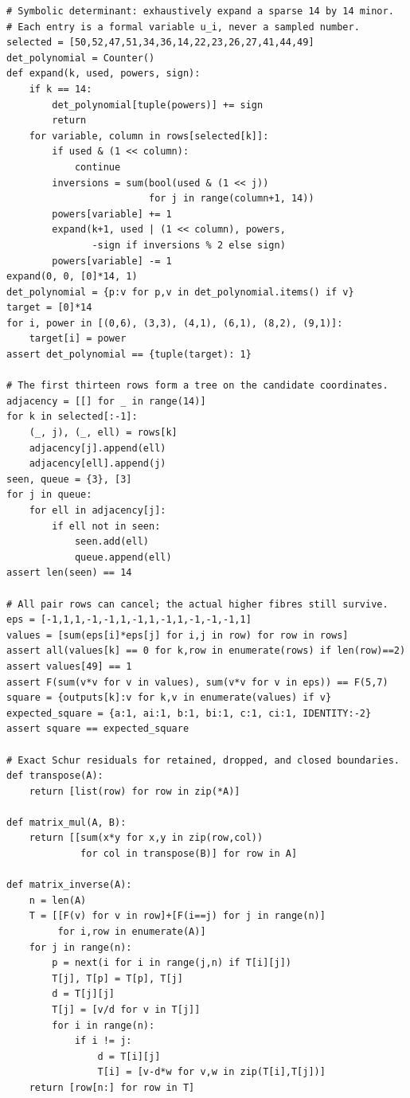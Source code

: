 \documentclass[11pt,a4paper,oneside]{report}
\theoremstyle{definition}
\theoremstyle{remark}
\begin{document}
\begin{lstlisting}
# Symbolic determinant: exhaustively expand a sparse 14 by 14 minor.
# Each entry is a formal variable u_i, never a sampled number.
selected = [50,52,47,51,34,36,14,22,23,26,27,41,44,49]
det_polynomial = Counter()
def expand(k, used, powers, sign):
    if k == 14:
        det_polynomial[tuple(powers)] += sign
        return
    for variable, column in rows[selected[k]]:
        if used & (1 << column):
            continue
        inversions = sum(bool(used & (1 << j))
                         for j in range(column+1, 14))
        powers[variable] += 1
        expand(k+1, used | (1 << column), powers,
               -sign if inversions % 2 else sign)
        powers[variable] -= 1
expand(0, 0, [0]*14, 1)
det_polynomial = {p:v for p,v in det_polynomial.items() if v}
target = [0]*14
for i, power in [(0,6), (3,3), (4,1), (6,1), (8,2), (9,1)]:
    target[i] = power
assert det_polynomial == {tuple(target): 1}

# The first thirteen rows form a tree on the candidate coordinates.
adjacency = [[] for _ in range(14)]
for k in selected[:-1]:
    (_, j), (_, ell) = rows[k]
    adjacency[j].append(ell)
    adjacency[ell].append(j)
seen, queue = {3}, [3]
for j in queue:
    for ell in adjacency[j]:
        if ell not in seen:
            seen.add(ell)
            queue.append(ell)
assert len(seen) == 14

# All pair rows can cancel; the actual higher fibres still survive.
eps = [-1,1,1,-1,-1,1,-1,1,-1,1,-1,-1,-1,1]
values = [sum(eps[i]*eps[j] for i,j in row) for row in rows]
assert all(values[k] == 0 for k,row in enumerate(rows) if len(row)==2)
assert values[49] == 1
assert F(sum(v*v for v in values), sum(v*v for v in eps)) == F(5,7)
square = {outputs[k]:v for k,v in enumerate(values) if v}
expected_square = {a:1, ai:1, b:1, bi:1, c:1, ci:1, IDENTITY:-2}
assert square == expected_square

# Exact Schur residuals for retained, dropped, and closed boundaries.
def transpose(A):
    return [list(row) for row in zip(*A)]

def matrix_mul(A, B):
    return [[sum(x*y for x,y in zip(row,col))
             for col in transpose(B)] for row in A]

def matrix_inverse(A):
    n = len(A)
    T = [[F(v) for v in row]+[F(i==j) for j in range(n)]
         for i,row in enumerate(A)]
    for j in range(n):
        p = next(i for i in range(j,n) if T[i][j])
        T[j], T[p] = T[p], T[j]
        d = T[j][j]
        T[j] = [v/d for v in T[j]]
        for i in range(n):
            if i != j:
                d = T[i][j]
                T[i] = [v-d*w for v,w in zip(T[i],T[j])]
    return [row[n:] for row in T]


\end{lstlisting}
\end{document}
